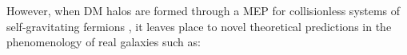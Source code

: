 However, when DM halos are formed through a MEP for collisionless systems of self-gravitating fermions \citep{1998MNRAS.300..981C,2015PhRvD..92l3527C,2020EPJP..135..290C,2021MNRAS.502.4227A}, it leaves place to novel theoretical predictions in the phenomenology of real galaxies \citep{2018PDU....21...82A,2019PDU....24..278A,2020A&A...641A..34B,2021MNRAS.505L..64B,2021MNRAS.502.4227A,2022MNRAS.511L..35A} such as:

